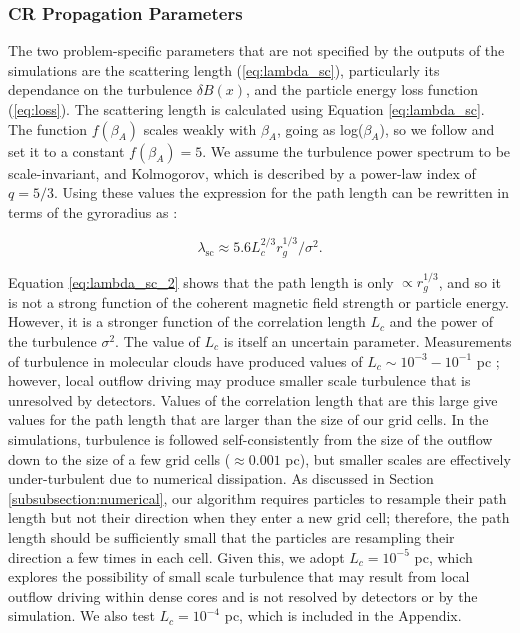 \documentclass[twocolumn]{aastex63}
\def\t{\text}
\begin{document}
\subsubsection{CR Propagation Parameters}
\label{subsubsection:crparameters}

The two problem-specific parameters that are not specified by the outputs of the \cite{offner_2017_impact} simulations are the scattering length (\ref{eq:lambda_sc}), particularly its dependance on the turbulence $\delta B(x)$, and the particle energy loss function (\ref{eq:loss}). The scattering length is calculated using Equation \ref{eq:lambda_sc}. The function $f(\beta_A)$ scales weakly with $\beta_A$, going as log($\beta_A$), so we follow \cite{fryer_2007_probing} and set it to a constant $f(\beta_A)= 5$. We assume the turbulence power spectrum to be scale-invariant, and Kolmogorov, which is described by a power-law index of $q=5/3$. Using these values the expression for the path length can be rewritten in terms of the gyroradius as \citep{fraschetti_2018_mottled}: 

\begin{equation}
    \label{eq:lambda_sc_2}
    \lambda_{\t{sc}}\approx 5.6L_c^{2/3}r_g^{1/3}/\sigma^2. 
\end{equation}

Equation \ref{eq:lambda_sc_2} shows that the path length is only $\propto r_g^{1/3}$, and so it is not a strong function of the coherent magnetic field strength or particle energy. However, it is a stronger function of the correlation length $L_c$ and the power of the turbulence $\sigma^2$. The value of $L_c$ is itself an uncertain parameter. Measurements of turbulence in molecular clouds have produced values of $L_c \sim 10^{-3}-10^{-1}$ pc \citep{houde_2011_bfields, houde_2016_bfields}; however, local outflow driving may produce smaller scale turbulence that is unresolved by detectors. Values of the correlation length that are this large give values for the path length that are larger than the size of our grid cells. In the \cite{offner_2017_impact} simulations, turbulence is followed self-consistently from the size of the outflow down to the size of a few grid cells ($\approx 0.001$ pc), but smaller scales are effectively under-turbulent due to numerical dissipation. As discussed in Section \ref{subsubsection:numerical}, our algorithm requires particles to resample their path length but not their direction when they enter a new grid cell; therefore, the path length should be sufficiently small that the particles are resampling their direction a few times in each cell. Given this, we adopt $L_c= 10^{-5}$ pc, which explores the possibility of small scale turbulence that may result from local outflow driving within dense cores and is not resolved by detectors or by the simulation. We also test $L_c= 10^{-4}$ pc, which is included in the Appendix. 
\end{document}
